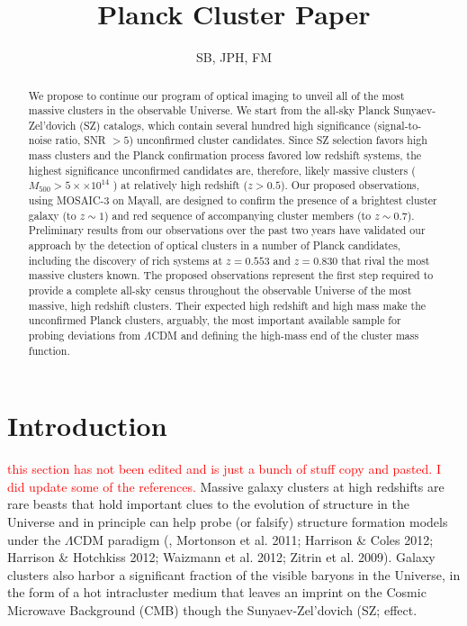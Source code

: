 \documentclass[apj, revtex4]{emulateapj}
\newcommand{\editorial}[1]{\textcolor{red}{#1}}
\begin{document}
	
\title{Planck Cluster Paper}
	
\author{\sc SB, JPH, FM} 
	


\begin{abstract}
	\noindent We propose to continue our program of optical imaging to unveil all of the most massive clusters in
	the observable Universe. We start from the all-sky Planck Sunyaev-Zel’dovich (SZ) catalogs, which contain several hundred high significance (signal-to-noise ratio, SNR $> 5$) unconfirmed cluster candidates. Since SZ selection favors high mass clusters and the Planck confirmation process favored	low redshift systems, the highest significance unconfirmed candidates are, therefore, likely massive clusters ($M_{500} > 5 ×\times 10^{14}$ \Msol) at relatively high redshift ($z > 0.5$). Our proposed observations,	using MOSAIC-3 on Mayall, are designed to confirm the presence of a brightest cluster galaxy (to $z \sim 1$) and red sequence of accompanying cluster members (to $z \sim 0.7$). Preliminary results from our observations over the past two years have validated our approach by the detection of optical clusters in a number of Planck candidates, including the discovery of rich systems at $z = 0.553$ and $z = 0.830$ that rival the most massive clusters known. The proposed observations represent the first step required to provide a complete all-sky census throughout the observable Universe of the most massive, high redshift clusters. Their expected high redshift and high mass make the unconfirmed Planck clusters, arguably, the most important available sample for probing deviations from $\Lambda$CDM and defining the high-mass end of the cluster mass function.
\end{abstract}

\section{Introduction}
\editorial{this section has not been edited and is just a bunch of stuff copy and pasted. I did update some of the references.}
Massive galaxy clusters at high redshifts are rare beasts that hold important clues to the evolution of structure in the Universe and in principle can help probe (or falsify) structure formation models under the $\Lambda$CDM paradigm (\eg, Mortonson et al. 2011; Harrison \& Coles 2012; Harrison \& Hotchkiss 2012; Waizmann et al. 2012; Zitrin et al. 2009). Galaxy clusters also harbor a significant fraction of the visible baryons in the Universe, in the form of a hot intracluster medium that leaves an imprint on the Cosmic Microwave Background (CMB) though the Sunyaev-Zel'dovich (SZ; \citealt{Sunyaev1972} effect. 
\end{document}
